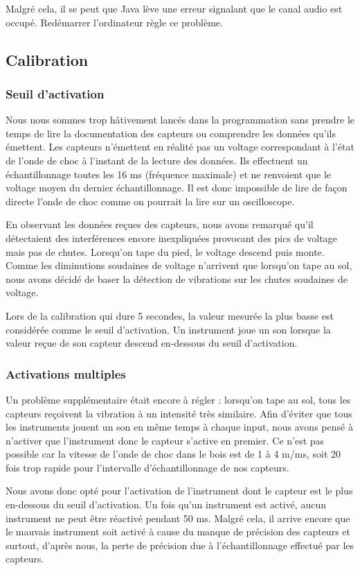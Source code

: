 \documentclass[11pt,a4paper,twoside,svgnames]{article}
\begin{document}
	Malgré cela, il se peut que Java lève une erreur signalant que le canal audio est occupé. Redémarrer l'ordinateur règle ce problème.
	
	\subsection{Calibration}
	\subsubsection{Seuil d'activation}
	Nous nous sommes trop hâtivement lancés dans la programmation sans prendre le temps de lire la documentation des capteurs ou comprendre les données qu'ils émettent. Les capteurs n'émettent en réalité pas un voltage correspondant à l'état de l'onde de choc à l'instant de la lecture des données. Ils effectuent un échantillonnage toutes les 16 ms (fréquence maximale) et ne renvoient que le voltage moyen du dernier échantillonnage. Il est donc impossible de lire de façon directe l'onde de choc comme on pourrait la lire sur un oscilloscope.
	
	
	En observant les données reçues des capteurs, nous avons remarqué qu'il détectaient des interférences encore inexpliquées provocant des pics de voltage mais pas de chutes. Lorsqu'on tape du pied, le voltage descend puis monte. Comme les diminutions soudaines de voltage n'arrivent que lorsqu'on tape au sol, nous avons décidé de baser la détection de vibrations sur les chutes soudaines de voltage.
	
	Lors de la calibration qui dure 5 secondes, la valeur mesurée la plus basse est considérée comme le seuil d'activation. Un instrument joue un son lorsque la valeur reçue de son capteur descend en-dessous du seuil d'activation.
	
	\subsubsection{Activations multiples}
	Un problème supplémentaire était encore à régler : lorsqu'on tape au sol, tous les capteurs reçoivent la vibration à un intensité très similaire. Afin d'éviter que tous les instruments jouent un son en même temps à chaque input, nous avons pensé à n'activer que l'instrument donc le capteur s'active en premier. Ce n'est pas possible car la vitesse de l'onde de choc dans le bois est de 1 à 4 m/ms, soit 20 fois trop rapide pour l'intervalle d'échantillonnage de nos capteurs.
	
	Nous avons donc opté pour l'activation de l'instrument dont le capteur est le plus en-dessous du seuil d'activation. Un fois qu'un instrument est activé, aucun instrument ne peut être réactivé pendant 50 ms. Malgré cela, il arrive encore que le mauvais instrument soit activé à cause du manque de précision des capteurs et surtout, d'après nous, la perte de précision due à l'échantillonnage effectué par les capteurs.
	
\end{document}

